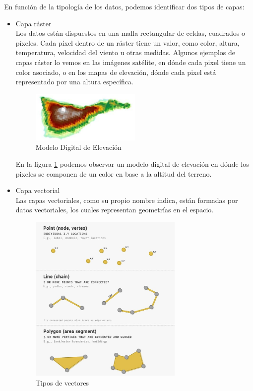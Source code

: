 En función de la tipología de los datos, podemos identificar dos tipos de capas:
\begin{itemize}
  \item Capa ráster\\
  Los datos están dispuestos en una malla rectangular de celdas, cuadrados o píxeles.
  Cada píxel dentro de un ráster tiene un valor, como color, altura, temperatura, velocidad del viento u otras medidas.
  Algunos ejemplos de capas ráster lo vemos en las imágenes satélite, en dónde cada pixel tiene un color asociado, 
  o en los mapas de elevación, dónde cada pixel está representado por una altura específica.

  \begin{figure}[H]
    \centering
    \includegraphics[width=0.50\textwidth]{Imagenes/GIS/mapa-elevacion.png}
    \caption{Modelo Digital de Elevación} \label{fig:mapaElev}
  \end{figure}

  En la figura \ref{fig:mapaElev} podemos observar un modelo digital de elevación en dónde los pixeles se componen de un color en base a la altitud del terreno.

  \item Capa vectorial\\
  Las capas vectoriales, como su propio nombre indica, están formadas por datos vectoriales, los cuales representan geometrías en el espacio.

  \begin{figure}[H]
    \centering
    \includegraphics[width=0.7\textwidth]{Imagenes/GIS/geometrias-capa-vectorial.jpg}
    \caption{Tipos de vectores} \label{fig:geoVectorial}
  \end{figure}


\end{itemize}
